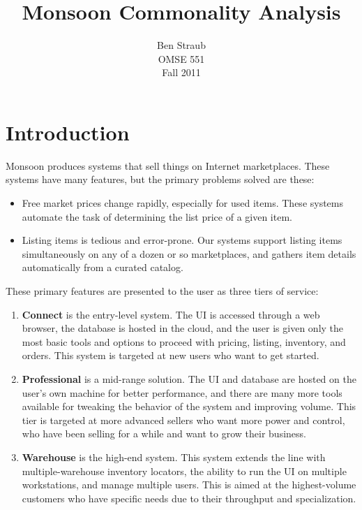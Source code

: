 \documentclass[letterpaper,11pt]{article}
\newcounter{type}
\newcounter{item}[type]
\begin{document}
\author{Ben Straub\\OMSE 551\\Fall 2011}
\title{Monsoon Commonality Analysis}
\date{}
\maketitle

\vspace{2cm}
\setcounter{tocdepth}{1}
\tableofcontents
\clearpage

\section{Introduction}

Monsoon produces systems that sell things on Internet marketplaces.  These systems have many features, but the primary problems solved are these:

\begin{itemize}
\item Free market prices change rapidly, especially for used items.  These systems automate the task of determining the list price of a given item.
\item Listing items is tedious and error-prone.  Our systems support listing items simultaneously on any of a dozen or so marketplaces, and gathers item details automatically from a curated catalog.
\end{itemize}

These primary features are presented to the user as three tiers of service:

\begin{enumerate}
\item \textbf{Connect} is the entry-level system.  The UI is accessed through a web browser, the database is hosted in the cloud, and the user is given only the most basic tools and options to proceed with pricing, listing, inventory, and orders.  This system is targeted at new users who want to get started.
\item \textbf{Professional} is a mid-range solution.  The UI and database are hosted on the user's own machine for better performance, and there are many more tools available for tweaking the behavior of the system and improving volume.  This tier is targeted at more advanced sellers who want more power and control, who have been selling for a while and want to grow their business.
\item \textbf{Warehouse} is the high-end system.  This system extends the line with multiple-warehouse inventory locators, the ability to run the UI on multiple workstations, and manage multiple users.  This is aimed at the highest-volume customers who have specific needs due to their throughput and specialization.
\end{enumerate}
\end{document}
